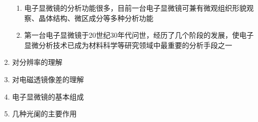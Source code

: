 \documentclass[12pt,a4paper]{article}
\begin{document}
\begin{enumerate}
\begin{enumerate}
                \item 电子显微镜的分析功能很多，目前一台电子显微镜可兼有微观组织形貌观察、晶体结构、微区成分等多种分析功能
                \item 第一台电子显微镜于20世纪30年代问世，经历了几个阶段的发展，使电子显微分析技术已成为材料科学等研究领域中最重要的分析手段之一
            \end{enumerate}
        \item 对分辨率的理解
        \item 对电磁透镜像差的理解
        \item 电子显微镜的基本组成
        \item 几种光阑的主要作用
    \end{enumerate}

    
\end{document}
